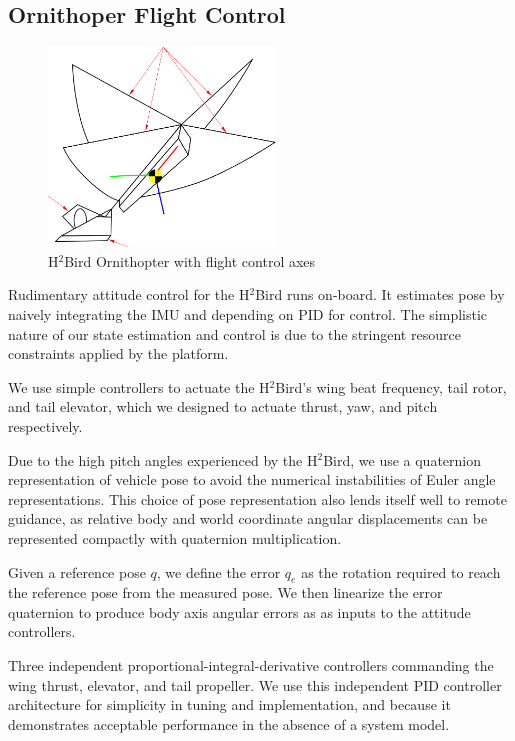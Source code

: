 \documentclass{aamas2013}
\begin{document}
\subsection{Ornithoper Flight Control}

\begin{figure}[tb]
\centering
\includegraphics[height=150pt]{figures/h2bird_axes.png}
\caption{H$^2$Bird Ornithopter with flight control axes}
\label{fig:h2Bird_axes}
\end{figure}

Rudimentary attitude control for the H$^2$Bird runs on-board. It estimates pose by naively integrating the IMU and depending on PID for control. The simplistic nature of our state estimation and control is due to the stringent resource constraints applied by the platform.

We use simple controllers to actuate the H$^2$Bird's wing beat frequency, tail rotor, and tail elevator, which we designed to actuate thrust, yaw, and pitch respectively.

Due to the high pitch angles experienced by the H$^2$Bird, we use a quaternion representation of vehicle pose to avoid the numerical instabilities of Euler angle representations. This choice of pose representation also lends itself well to remote guidance, as relative body and world coordinate angular displacements can be represented compactly with quaternion multiplication.  

Given a reference pose $q$, we define the error $q_e$ as the rotation required to reach the reference pose from the measured pose. We then linearize the error quaternion to produce body axis angular errors as as inputs to the attitude controllers. 

Three independent proportional-integral-derivative controllers commanding the wing thrust, elevator, and tail propeller. We use this independent PID controller architecture for simplicity in tuning and implementation, and because it demonstrates acceptable performance in the absence of a system model.
\end{document}
